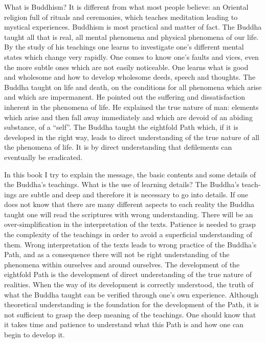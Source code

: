 \documentclass{book}
\begin{document}
What is Buddhism? It is different from what most people believe: an
Oriental religion full of rituals and ceremonies, which teaches
meditation leading to mystical experiences. Buddhism is most practical
and matter of fact. The Buddha taught all that is real, all mental
phenomena and physical phenomena of our life. By the study of his
teach­ings one learns to investigate one's different mental states which
change very rapidly. One comes to know one's faults and vices, even the
more subtle ones which are not easily noticeable. One learns what is
good and wholesome and how to develop wholesome deeds, speech and
thoughts. The Buddha taught on life and death, on the conditions for all
phenomena which arise and which are impermanent. He pointed out the
suffering and dis­satisfaction inherent in the phenomena of life. He
explained the true nature of man: elements which arise
and then fall away immediately and which are devoid of an abiding
substance, of a ``self''. The Buddha taught the eightfold Path which, if
it is developed in the right way, leads to direct understanding of the
true nature of all the pheno­mena of life. It is by direct
under­standing that defilements can eventually be eradicated.

In this book I try to explain the message, the basic contents and some
details of the Buddha's teachings. What is the use of learning details?
The Buddha's teach­ings are subtle and deep and therefore it is
necessary to go into details. If one does not know that there are many
different aspects to each reality the Buddha taught one will read the
scriptures with wrong understanding. There will be an
over-simplification in the interpretation of the texts. Patience is
needed to grasp the complexity of the teachings in order to avoid a
superficial understanding of them. Wrong interpretation of the texts
leads to wrong practice of the Buddha's Path, and as a consequence there
will not be right understanding of the phenomena within ourselves and
around ourselves. The development of the eightfold Path is the
development of direct understanding of the true nature of realities.
When the way of its develop­ment is correctly understood, the truth of
what the Buddha taught can be verified through one's own experience.
Although theoretical understanding is the founda­tion for the
develop­ment of the Path, it is not sufficient to grasp the deep meaning
of the teachings. One should know that it takes time and patience to
understand what this Path is and how one can begin to develop it.
\end{document}
